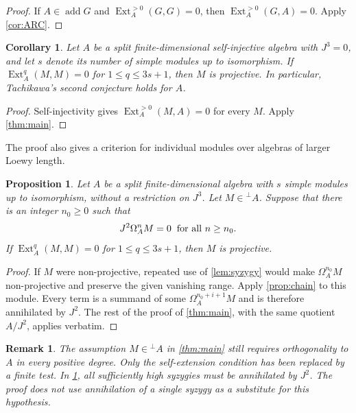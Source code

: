 \documentclass[a4paper,reqno]{amsart}
\numberwithin{equation}{section}
\newtheorem{proposition}[proposition]{Proposition}
\newtheorem{corollary}[corollary]{Corollary}
\newtheorem{remark}[remark]{Remark}
\newcommand{\Ext}{\operatorname{Ext}}
\newcommand{\add}{\operatorname{add}}
\newcommand{\perpA}{{}^{\perp}\!A}
\begin{document}
\begin{proof}
If $A\in\add G$ and $\Ext_A^{>0}(G,G)=0$, then
$\Ext_A^{>0}(G,A)=0$. Apply \cref{cor:ARC}.
\end{proof}

\begin{corollary}\label{cor:TC2}
Let $A$ be a split finite-dimensional self-injective algebra with
$J^3=0$, and let $s$ denote its number of simple modules up to
isomorphism. If $\Ext_A^q(M,M)=0$ for $1\le q\le3s+1$, then $M$ is
projective. In particular, Tachikawa's second conjecture holds for
$A$.
\end{corollary}

\begin{proof}
Self-injectivity gives $\Ext_A^{>0}(M,A)=0$ for every $M$.
Apply \cref{thm:main}.
\end{proof}

The proof also gives a criterion for individual modules over
algebras of larger Loewy length.

\begin{proposition}\label{prop:eventual-syzygies}
Let $A$ be a split finite-dimensional algebra with $s$ simple modules
up to isomorphism, without a restriction on $J^3$. Let $M\in\perpA$.
Suppose that there is an integer $n_0\ge0$ such that
\[
 J^2\Omega_A^nM=0\hspace{2mm}\text{for all }n\ge n_0.
\]
If $\Ext_A^q(M,M)=0$ for $1\le q\le3s+1$, then $M$ is projective.
\end{proposition}

\begin{proof}
If $M$ were non-projective, repeated use of \cref{lem:syzygy} would
make $\Omega_A^{n_0}M$ non-projective and preserve the given
vanishing range. Apply \cref{prop:chain} to this module. Every term
is a summand of some $\Omega_A^{n_0+i+1}M$ and is therefore
annihilated by $J^2$. The rest of the proof of \cref{thm:main}, with
the same quotient $A/J^2$, applies verbatim.
\end{proof}

\begin{remark}\label{rem:scope}
The assumption $M\in\perpA$ in \cref{thm:main} still requires
orthogonality to $A$ in every positive degree. Only the
self-extension condition has been replaced by a finite test.
In \cref{prop:eventual-syzygies}, all sufficiently high syzygies
must be annihilated by $J^2$. The proof does not use annihilation of a
single syzygy as a substitute for this hypothesis.
\end{remark}
\end{document}
